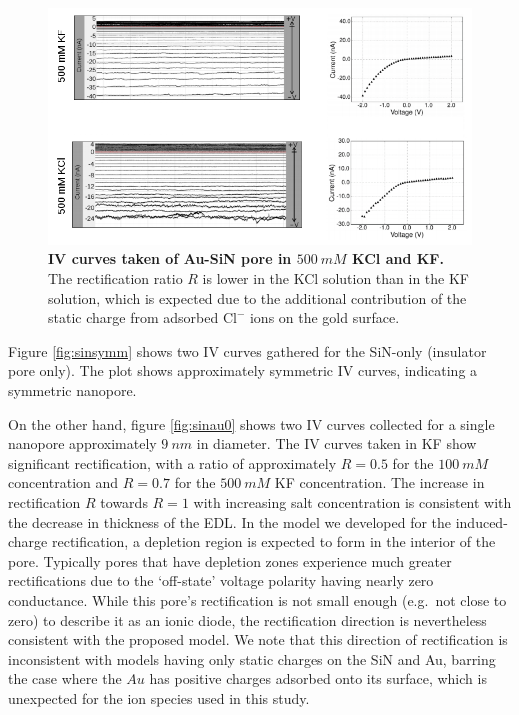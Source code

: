 		\begin{figure}
			\includegraphics[width=\textwidth]{sinau1}
			\caption{\textbf{IV curves taken of Au-SiN pore in $\SI{500}{mM}$ KCl and KF.} The rectification ratio $R$ is lower in the KCl solution than in the KF solution, which is expected due to the additional contribution of the static charge from adsorbed $\mathrm{Cl^{-}}$ ions on the gold surface.}
			\label{fig:sinau1}
		\end{figure}


		
		Figure \ref{fig:sinsymm} shows two IV curves gathered for the SiN-only (insulator pore only). The plot shows approximately symmetric IV curves, indicating a symmetric nanopore. 
		
		On the other hand, figure \ref{fig:sinau0} shows two IV curves collected for a single nanopore approximately $\SI{9}{nm}$ in diameter. The IV curves taken in KF show significant rectification, with a ratio of approximately $R=0.5$ for the $\SI{100}{mM}$ concentration and $R=0.7$ for the $\SI{500}{mM}$ KF concentration. The increase in rectification $R$ towards $R=1$ with increasing salt concentration is consistent with the decrease in thickness of the EDL. In the model we developed for the induced-charge rectification, a depletion region is expected to form in the interior of the pore. Typically pores that have depletion zones experience much greater rectifications due to the `off-state' voltage polarity having nearly zero conductance. While this pore's rectification is not small enough (e.g.~not close to zero) to describe it as an ionic diode, the rectification direction is nevertheless consistent with the proposed model. We note that this direction of rectification is inconsistent with models having only static charges on the SiN and Au, barring the case where the $Au$ has positive charges adsorbed onto its surface, which is unexpected for the ion species used in this study.
		

